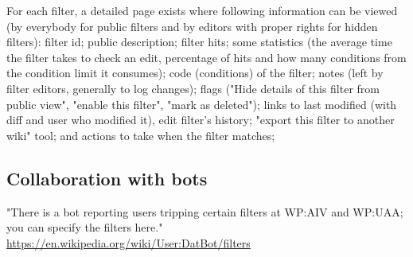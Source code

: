 \documentclass{sigchi}
\begin{document}
For each filter, a detailed page exists where following information can be viewed (by everybody for public filters and by editors with proper rights for hidden filters):
filter id; public description; filter hits; some statistics (the average time the filter takes to check an edit, percentage of hits and how many conditions from the condition limit it consumes); code (conditions) of the filter; notes (left by filter editors, generally to log changes); flags ("Hide details of this filter from public view", "enable this filter", "mark as deleted");
links to last modified (with diff and user who modified it), edit filter's history; "export this filter to another wiki" tool;
and actions to take when the filter matches;

\subsection{Collaboration with bots}

"There is a bot reporting users tripping certain filters at WP:AIV and WP:UAA; you can specify the filters here."
\url{https://en.wikipedia.org/wiki/User:DatBot/filters}
\end{document}

